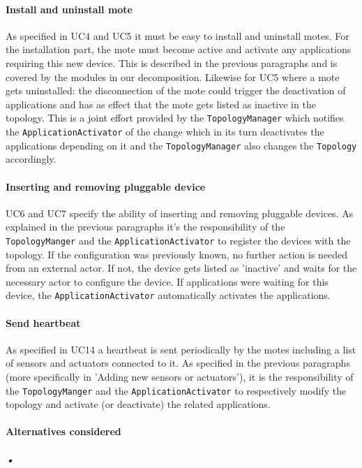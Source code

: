 \documentclass[english]{sareport}
\begin{document}
\paragraph{Install and uninstall mote}
As specified in UC4 and UC5 it must be easy to install and uninstall motes. For the installation part, the mote must become active and activate any applications requiring this new device. This is described in the previous paragraphs and is covered by the modules in our decomposition. Likewise for UC5 where a mote gets uninstalled: the disconnection of the mote could trigger the deactivation of applications and has as effect that the mote gets listed as inactive in the topology. This is a joint effort provided by the \texttt{TopologyManager} which notifies the \texttt{ApplicationActivator} of the change which in its turn deactivates the applications depending on it and the \texttt{TopologyManager} also changes the \texttt{Topology} accordingly.

\paragraph{Inserting and removing pluggable device}
UC6 and UC7 specify the ability of inserting and removing pluggable devices. As explained in the previous paragraphs it's the responsibility of the \texttt{TopologyManger} and the \texttt{ApplicationActivator} to register the devices with the topology. If the configuration was previously known, no further action is needed from an external actor. If not, the device gets listed as 'inactive' and waits for the necessary actor to configure the device. If applications were waiting for this device, the \texttt{ApplicationActivator} automatically activates the applications. 

\paragraph{Send heartbeat}
As specified in UC14 a heartbeat is sent periodically by the motes including a list of sensors and actuators connected to it. As specified in the previous paragraphs (more specifically in 'Adding new sensors or actuators'), it is the responsibility of the \texttt{TopologyManger} and the \texttt{ApplicationActivator} to respectively modify the topology and activate (or deactivate) the related applications.

\paragraph{Alternatives considered}
\subparagraph{•}
\end{document}
